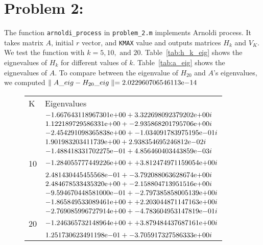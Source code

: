 \newpage
\section*{Problem 2:}

The function \texttt{arnoldi\_process} in \texttt{problem\_2.m} implements Arnoldi process. It takes matrix $A$, initial $r$ vector, and \texttt{KMAX} value and outputs matrices $H_{k}$ and $V_{K}$. We test the function with $k=5, 10, \text{\ and\ }20$. Table~\ref{tab:h_k_eig} shows the eignevalues of $H_{k}$ for different values of $k$. Table~\ref{tab:a_eig} shows the eignevalues of $A$. To compare between the eigenvalue of $H_{20}$ and $A$'s eigenvalues, we computed $\parallel A\_eig - H_{20}\_eig\parallel ={2.022960706546113}\mathrm{e}{-14}$

\begin{figure}[tbh]
 \centering    
\begin{tabular}{ |p{1cm}|| p{10cm}|}
\hline
 K & Eigenvalues \\ \hhline{|=|=|}   
\hline
5 & ${-1.667643118967301}\mathrm{e}{+00} + {3.322698092379202}\mathrm{e}{+00i}$\\
  &	${1.122189729586331}\mathrm{e}{+00} + {- 2.935868201795706}\mathrm{e}{+00i}$\\
  &	${-2.454291098365838}\mathrm{e}{+00} + {- 1.034091783975195}\mathrm{e}{-01i}$\\
  &	${1.901983203411739}\mathrm{e}{+00} + {2.938354695246812}\mathrm{e}{-02i}$\\
  &	${-1.488418331702275}\mathrm{e}{-01} + {4.856460403443859}\mathrm{e}{-03i}$ \\  
\hline  
10& ${-1.284055777449226}\mathrm{e}{+00} + {+ 3.812474971159054}\mathrm{e}{+00i}$\\
  &	${ 2.481430445455568}\mathrm{e}{-01} + {- 3.792088063628674}\mathrm{e}{+00i}$\\
  &	${ 2.484678533435320}\mathrm{e}{+00} + {- 2.158804713951516}\mathrm{e}{+00i}$\\
  &	${-9.594670448581000}\mathrm{e}{-01} + {- 2.797385858005139}\mathrm{e}{+00i}$\\
  &	${-1.865849533089461}\mathrm{e}{+00} + {+ 2.203044871147163}\mathrm{e}{+00i}$ \\  
  &	${-2.769085996727914}\mathrm{e}{+00} + {- 4.783604953147819}\mathrm{e}{-01i}$ \\       
\hline  
20& ${-1.246365732148964}\mathrm{e}{+00} + {+ 3.879484437687161}\mathrm{e}{+00i}$\\
  &	${ 1.251730623491198}\mathrm{e}{-01} + {- 3.705917327586333}\mathrm{e}{+00i}$\\

\end{tabular}
\end{figure}

